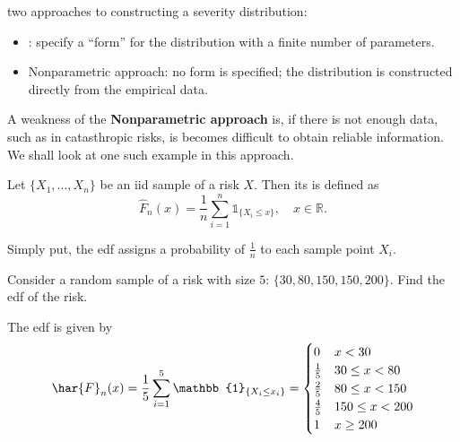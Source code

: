 \documentclass[notoc,notitlepage]{tufte-book}
\begin{document}
 two approaches to constructing a severity distribution:
\begin{itemize}
  \item {}: specify a ``form'' for the distribution with a finite number of parameters.
  \item Nonparametric approach: no form is specified; the distribution is constructed directly from the empirical data.
\end{itemize}

A weakness of the \textbf{Nonparametric approach} is, if there is not enough data, such as in catasthropic risks, is becomes difficult to obtain reliable information. We shall look at one such example in this approach.

\begin{defn}
\label{defn:empirical_distribution_function}
  Let $\{ X_1, ..., X_n \}$ be an iid sample of a risk $X$. Then its  is defined as
  \begin{equation*}
    \hat{F}_n(x) = \frac{1}{n} \sum_{i=1}^{n}  \mathbb{1}_{\{X_i \leq x\}}, \quad x \in \mathbb{R}.
  \end{equation*}
\end{defn}

\begin{remark}
  Simply put, the edf assigns a probability of $\frac{1}{n}$ to each sample point $X_i$.
\end{remark}

\begin{eg}
  Consider a random sample of a risk with size $5$: $\{ 30, 80, 150, 150, 200 \}$. Find the edf of the risk.
\end{eg}

\begin{solution}
  The edf is given by
  \begin{equation*}
    \har{F}_n(x) = \frac{1}{5} \sum_{i=1}^{5} \mathbb{1}_{\{ X_i \leq x_i \}} = \begin{cases}
      0           & x < 30 \\
      \frac{1}{5} & 30 \leq x < 80 \\
      \frac{2}{5} & 80 \leq x < 150 \\
      \frac{4}{5} & 150 \leq x < 200 \\
      1           & x \geq 200
    \end{cases}
  \end{equation*}
\end{solution}
\end{document}
